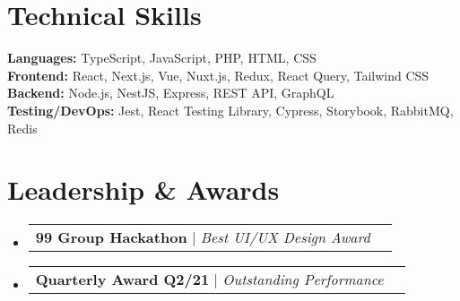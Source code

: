 \documentclass[a4paper, 11pt]{article}
\makeatletter
\newcommand{\resumeProjectHeading}[2]{
    \item
    \begin{tabular*}{0.987\textwidth}{l@{\extracolsep{\fill}}r}
      \small#1\\
    \end{tabular*}\vspace{-7pt}
}
\newcommand{\resumeSubHeadingListStart}{\begin{itemize}[leftmargin=0.1in, label={}]}
\newcommand{\resumeSubHeadingListEnd}{\end{itemize}\vspace{5pt}}
\makeatother
\begin{document}
\section{Technical Skills}
  \resumeSubHeadingListStart
    \small{\item{
      \textbf{Languages:}{ TypeScript, JavaScript, PHP, HTML, CSS} \\
      \textbf{Frontend:}{ React, Next.js, Vue, Nuxt.js, Redux, React Query, Tailwind CSS} \\
      \textbf{Backend:}{ Node.js, NestJS, Express, REST API, GraphQL} \\
      \textbf{Testing/DevOps:}{ Jest, React Testing Library, Cypress, Storybook, RabbitMQ, Redis}
    }}
  \resumeSubHeadingListEnd

\section{Leadership & Awards}
    \resumeSubHeadingListStart
        \resumeProjectHeading
            {\textbf{99 Group Hackathon} $|$ \emph{Best UI/UX Design Award}}{2021}
        \resumeProjectHeading
            {\textbf{Quarterly Award Q2/21} $|$ \emph{Outstanding Performance}}{2021}
    \resumeSubHeadingListEnd
\end{document}
